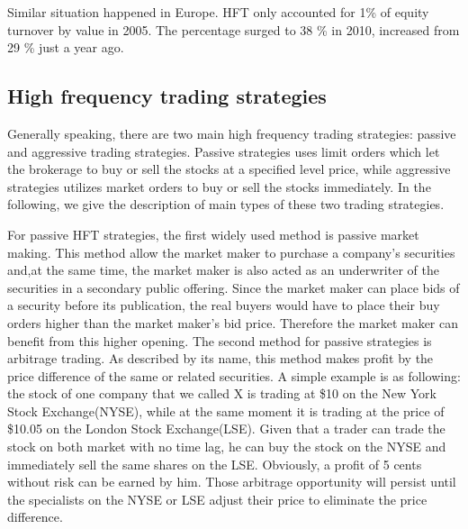 Similar situation happened in Europe. HFT only accounted for 1\% of equity turnover by value in 2005. The percentage surged to 38 \% in 2010, increased from 29 \% just a year ago.
\subsection{High frequency trading strategies}
Generally speaking, there are two main high frequency trading strategies: passive and aggressive trading strategies. Passive strategies uses limit orders which let the brokerage to buy or sell the stocks at a specified level price, while aggressive strategies utilizes market orders to buy or sell the stocks immediately. In the following, we give the description of main types of these two trading strategies. 

For passive HFT strategies, the first widely used method is passive market making. This method allow the market maker to purchase a company's securities and,at the same time, the market maker is also acted as an underwriter of the 
securities in a secondary public offering. Since the market maker can place bids of a security before its publication, the real buyers would have to place their buy orders higher than the market maker's bid price. Therefore the market maker can  benefit from this higher opening. The second method for passive strategies is arbitrage trading. As described by its name, this method makes profit by the price difference of the same or related securities. A simple example is as following: the stock of one company that we called X is trading at \$10 on the New York Stock Exchange(NYSE), while at the same moment it is trading at the price of \$10.05 on the London Stock Exchange(LSE).  Given that a trader can trade the stock on both market with no time lag, he can buy the stock on the NYSE and immediately sell the same shares on the LSE. Obviously, a profit of 5 cents without risk can be earned by him. Those arbitrage opportunity will persist until the specialists on the NYSE or LSE adjust their price to eliminate the price difference.

